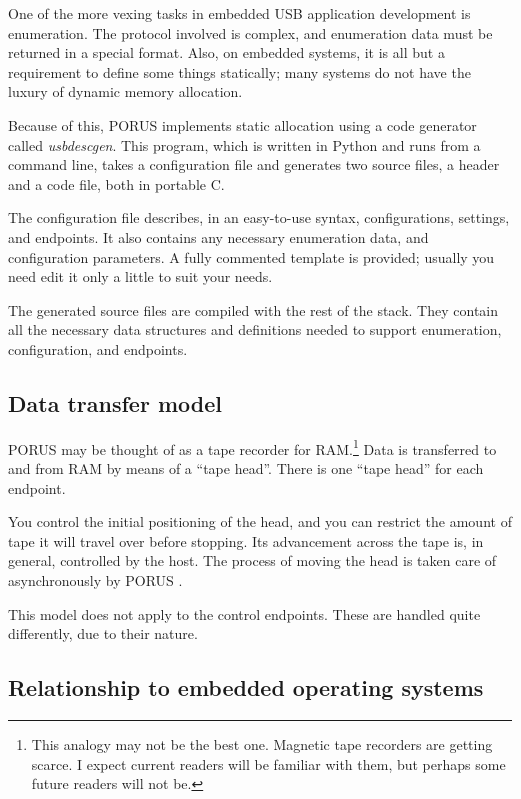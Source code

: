\documentclass[a4paper]{book}
\newcommand{\porus}{PORUS }
\newcommand{\exe}[1]{\textsl{#1}}
\begin{document}
One of the more vexing tasks in embedded USB application development is enumeration.  The protocol involved is complex, and enumeration data must be returned in a special format.  Also, on embedded systems, it is all but a requirement to define some things statically; many systems do not have the luxury of dynamic memory allocation.

Because of this, \porus implements static allocation using a code generator called \exe{usbdescgen}.  This program, which is written in Python and runs from a command line, takes a configuration file and generates two source files, a header and a code file, both in portable C.

The configuration file describes, in an easy-to-use syntax, configurations, settings, and endpoints.  It also contains any necessary enumeration data, and configuration parameters.  A fully commented template is provided; usually you need edit it only a little to suit your needs.

The generated source files are compiled with the rest of the stack.  They contain all the necessary data structures and definitions needed to support enumeration, configuration, and endpoints.

\subsection{Data transfer model}

\porus may be thought of as a tape recorder for RAM.\footnote{This analogy may not be the best one.  Magnetic tape recorders are getting scarce.  I expect current readers will be familiar with them, but perhaps some future readers will not be.}  Data is transferred to and from RAM by means of a ``tape head''.  There is one ``tape head'' for each endpoint. 

You control the initial positioning of the head, and you can restrict the amount of tape it will travel over before stopping.  Its advancement across the tape is, in general, controlled by the host.  The process of moving the head is taken care of asynchronously by \porus.

This model does not apply to the control endpoints.  These are handled quite differently, due to their nature.

\subsection{Relationship to embedded operating systems}
\end{document}
